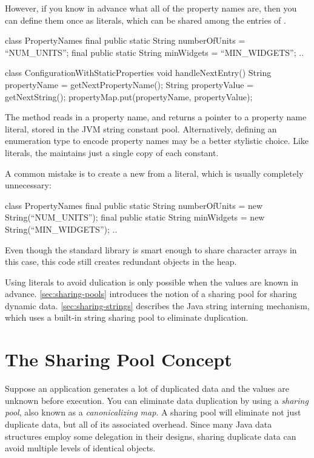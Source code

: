 However, if you know in advance what all of the property names are, then you can
define them once as  literals, which can be shared among the
entries of .
\begin{shortlisting}
class PropertyNames {
	final public static String numberOfUnits = ``NUM_UNITS'';
	final public static String minWidgets = ``MIN_WIDGETS'';
	..
}

class ConfigurationWithStaticProperties {
    void handleNextEntry() {
       String propertyName = getNextPropertyName(); 
       String propertyValue = getNextString();
       propertyMap.put(propertyName, propertyValue);
    }
}
\end{shortlisting}
The  method reads in a property name, and returns
a pointer to a property name literal, stored in the JVM string
constant pool. Alternatively, defining an enumeration
type to encode property names may be a better stylistic choice.  Like
 literals, the \jre maintains just a single copy of each
 constant.

A common
 mistake is to create a new   from a  literal,
 which is usually completely unnecessary:
\begin{shortlisting}
class PropertyNames {
	final public static String numberOfUnits = 
	                           new String(``NUM_UNITS'');
	final public static String minWidgets = 
	                           new String(``MIN_WIDGETS'');
	..
}
\end{shortlisting}
Even though the standard library is smart enough to share
character arrays in this case, this code still creates redundant 
objects in the heap.

Using  literals to avoid dulication is only possible when the
 values are known in advance. 
\autoref{sec:sharing-pools} introduces the notion of a sharing pool for
sharing dynamic data. \autoref{sec:sharing-strings} describes the Java
string interning mechanism, which uses a built-in string sharing pool to
eliminate duplication.

\section{The Sharing Pool Concept}
\label{sec:sharing-pools}

Suppose an application generates a lot of duplicated data and the values
are unknown before execution. 
You can eliminate data duplication by using a \emph{sharing pool}, also known
as a \emph{canonicalizing map}. 
A sharing pool will eliminate not just duplicate data, 
but all of its associated overhead. Since many Java data structures employ 
some delegation in their designs, sharing duplicate data can avoid
multiple levels of identical objects.

